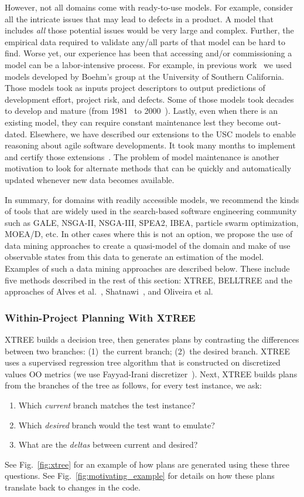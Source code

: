 \documentclass[smallextended]{svjour3}       %
\newcommand{\be}{\begin{enumerate}}
\newcommand{\ee}{\end{enumerate}}
\newcommand{\fig}[1]{Fig.~\ref{fig:#1}}
\begin{document}
However, not all domains come with ready-to-use models. For example, consider all the intricate issues that may lead to defects in a product. A model that includes {\em all} those potential issues would be very large and complex. Further, the empirical data required to validate any/all parts of that model can be hard to find.
Worse yet, our experience has been that accessing and/or commissioning a model can be a labor-intensive process.
For example, in previous work~\cite{me07f} we used models developed by Boehm's group at the University of Southern California.
Those models took as inputs project descriptors to output predictions of development effort, project risk, and defects.
Some of those models took decades to develop and mature (from 1981~\cite{boehm81} to 2000~\cite{boehm00b}). 
Lastly, even when there is an existing model, they can require constant maintenance lest they become out-dated. Elsewhere, we have described our extensions to the USC models to enable reasoning about agile software developments. It took many months to implement and certify those extensions~\cite{me09i, me09j}. The problem of model maintenance is another motivation to look for alternate methods that can be quickly and automatically updated whenever new data becomes available.

In summary, for domains with readily accessible models, we recommend
the kinds of tools that are widely used in the search-based
software engineering community such as GALE, NSGA-II, NSGA-III, SPEA2, IBEA, particle swarm optimization, MOEA/D, etc. In other cases where this is not an option, we propose the use of data mining approaches to create a quasi-model of the domain and make of use observable states from this data to generate an estimation of the model. Examples of such a data mining approaches are described below.
These include five methods described in the rest of this section: XTREE, BELLTREE and the approaches of 
Alves et al.~\cite{alves}, Shatnawi~\cite{shatnawi}, and Oliveira et al.~\cite{oliveira} 



\subsubsection{Within-Project Planning With XTREE}
\label{sect:XTREE}


XTREE builds a decision tree, then generates
plans by contrasting the differences between two branches:
(1)~the current branch; (2)~the desired branch.
XTREE uses a supervised regression tree algorithm that is constructed on discretized values OO metrics (we use Fayyad-Irani discretizer~\cite{fi}). Next, XTREE builds plans from the branches of the tree as follows, for every test instance, we ask:
\be
\item
Which {\em current} branch matches the test instance?
\item Which {\em desired} branch would the test want to emulate?
\item What are the {\em deltas} between current and desired? 
\ee
See \fig{xtree} for an example of how plans are generated using these three questions.
See \fig{motivating_example} for details on how these plans translate back to changes in the code.
\end{document}
